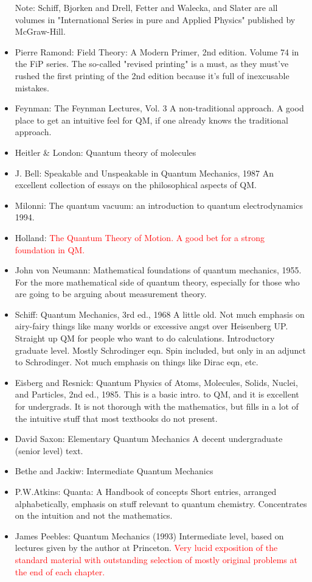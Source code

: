 \documentclass[10pt,a4paper]{book}
\theoremstyle{definition}
\begin{document}
\begin{itemize}
Note: Schiff, Bjorken and Drell, Fetter and Walecka, and Slater are all volumes in "International Series in pure and Applied Physics" published by McGraw-Hill.

\item Pierre Ramond: Field Theory: A Modern Primer, 2nd edition. Volume 74 in the FiP series.
The so-called "revised printing" is a must, as they must've rushed the first printing of the 2nd edition because it's full of inexcusable mistakes.

\item Feynman: The Feynman Lectures, Vol. 3
A non-traditional approach.  A good place to get an intuitive feel for QM, if one already knows the traditional approach.
\item Heitler \& London: Quantum theory of molecules
\item J. Bell: Speakable and Unspeakable in Quantum Mechanics, 1987
An excellent collection of essays on the philosophical aspects of QM.
\item Milonni: The quantum vacuum: an introduction to quantum electrodynamics 1994.
\item Holland: \textcolor{red}{The Quantum Theory of Motion. A good bet for a strong foundation in QM.}

\item John von Neumann: Mathematical foundations of quantum mechanics, 1955.
For the more mathematical side of quantum theory, especially for those who are going to be arguing about measurement theory.

\item Schiff: Quantum Mechanics, 3rd ed., 1968
A little old.  Not much emphasis on airy-fairy things like many worlds or excessive angst over Heisenberg UP.  Straight up QM for people who want to do calculations.  Introductory graduate level.  Mostly Schrodinger eqn.  Spin included, but only in an adjunct to Schrodinger.  Not much emphasis on things like Dirac eqn, etc.

\item Eisberg and Resnick: Quantum Physics of Atoms, Molecules, Solids, Nuclei, and Particles, 2nd ed., 1985.
This is a basic intro. to QM, and it is excellent for undergrads.  It is not thorough with the mathematics, but fills in a lot of the intuitive stuff that most textbooks do not present.
\item David Saxon: Elementary Quantum Mechanics
A decent undergraduate (senior level) text.
\item Bethe and Jackiw: Intermediate Quantum Mechanics
\item P.W.Atkins: Quanta: A Handbook of concepts
Short entries, arranged alphabetically, emphasis on stuff relevant to quantum chemistry.  Concentrates on the intuition and not the mathematics.
\item James Peebles: Quantum Mechanics (1993)
Intermediate level, based on lectures given by the author at Princeton.  \textcolor{red}{Very lucid exposition of the standard material with outstanding selection of mostly original problems at the end of each chapter.}
\end{itemize}
\end{document}
